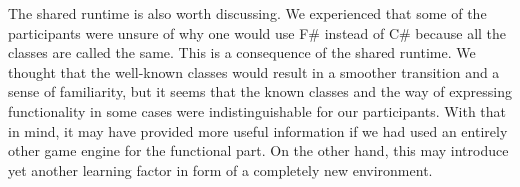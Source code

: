 The shared runtime is also worth discussing. We experienced that some of the participants were unsure of why one would use F\# instead of C\# because all the classes are called the same. This is a consequence of the shared runtime. We thought that the well-known classes would result in a smoother transition and a sense of familiarity, but it seems that the known classes and the way of expressing functionality in some cases were indistinguishable for our participants. With that in mind, it may have provided more useful information if we had used an entirely other game engine for the functional part. On the other hand, this may introduce yet another learning factor in form of a completely new environment.